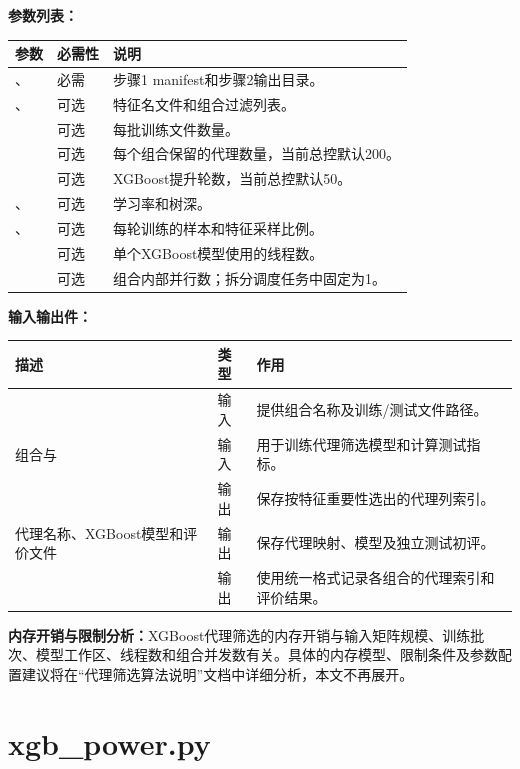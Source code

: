 \textbf{参数列表：}
\begin{longtable}{L{0.29\textwidth}L{0.14\textwidth}L{0.44\textwidth}}
\toprule 参数 & 必需性 & 说明 \\ \midrule
{}、 & 必需 & 步骤1 manifest和步骤2输出目录。 \\
、 & 可选 & 特征名文件和组合过滤列表。 \\
 & 可选 & 每批训练文件数量。 \\
 & 可选 & 每个组合保留的代理数量，当前总控默认200。 \\
 & 可选 & XGBoost提升轮数，当前总控默认50。 \\
、 & 可选 & 学习率和树深。 \\
、 & 可选 & 每轮训练的样本和特征采样比例。 \\
 & 可选 & 单个XGBoost模型使用的线程数。 \\
 & 可选 & 组合内部并行数；拆分调度任务中固定为1。 \\
\bottomrule
\end{longtable}

\textbf{输入输出件：}
\begin{longtable}{L{0.34\textwidth}L{0.13\textwidth}L{0.41\textwidth}}
\toprule 描述 & 类型 & 作用 \\ \midrule
{} & 输入 & 提供组合名称及训练/测试文件路径。 \\
组合与 & 输入 & 用于训练代理筛选模型和计算测试指标。 \\
 & 输出 & 保存按特征重要性选出的代理列索引。 \\
代理名称、XGBoost模型和评价文件 & 输出 & 保存代理映射、模型及独立测试初评。 \\
 & 输出 & 使用统一格式记录各组合的代理索引和评价结果。 \\
\bottomrule
\end{longtable}

\textbf{内存开销与限制分析：}XGBoost代理筛选的内存开销与输入矩阵规模、训练批次、模型工作区、线程数和组合并发数有关。具体的内存模型、限制条件及参数配置建议将在“代理筛选算法说明”文档中详细分析，本文不再展开。


\section{xgb\_power.py}

